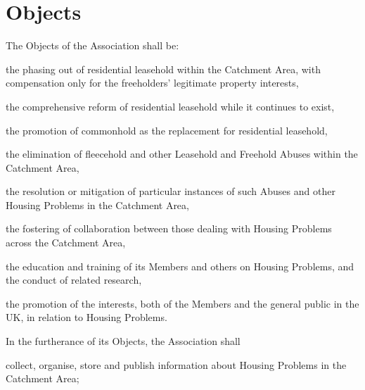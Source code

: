 \documentclass[10pt]{mk-articles-of-association}
\newcommand{\LAFA}[0]{Leasehold and Freehold Abuses}
\begin{document}
\section{Objects}
\begin{constenum}

\item The Objects of the Association shall be:

  \begin{constenum}

  \item the phasing out of residential leasehold within the Catchment
    Area, with compensation only for the freeholders' legitimate
    property interests,

  \item the comprehensive reform of residential leasehold while it
    continues to exist,

  \item the promotion of commonhold as the replacement for residential
    leasehold,

  \item the elimination of fleecehold and other \LAFA{} within the
    Catchment Area,

  \item the resolution or mitigation of particular instances of such
    Abuses and other Housing Problems in the Catchment Area,

  \item the fostering of collaboration between those dealing with
    Housing Problems across the Catchment Area,

  \item the education and training of its Members and others on
    Housing Problems, and the conduct of related research, \ITand

  \item the promotion of the interests, both of the Members and the
    general public in the UK, in relation to Housing Problems.

  \end{constenum}

\newpage

\item In the furtherance of its Objects, the Association shall
\begin{constenum}

  \item collect, organise, store and publish information about
    Housing Problems in the Catchment Area;


\end{constenum}
\end{constenum}
\end{document}
